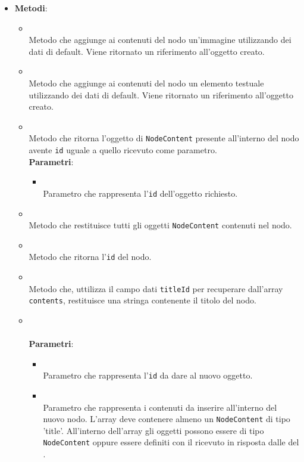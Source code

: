 \begin{itemize}
\begin{itemize}
\end{itemize}
\item \textbf{Metodi}:
\begin{itemize}
\item {}
\\ Metodo che aggiunge ai contenuti del nodo un'immagine utilizzando dei dati di default. Viene ritornato un riferimento all'oggetto creato.
\item {}
\\ Metodo che aggiunge ai contenuti del nodo un elemento testuale utilizzando dei dati di default. Viene ritornato un riferimento all'oggetto creato.
\item {}
\\ Metodo che ritorna l'oggetto di \texttt{NodeContent} presente all'interno del nodo avente \texttt{id} uguale a quello ricevuto come parametro.
\\ \textbf{Parametri}:
\begin{itemize}
\item {}
\\ Parametro che rappresenta l'\texttt{id} dell'oggetto richiesto.
\end{itemize}
\item {}
\\ Metodo che restituisce tutti gli oggetti \texttt{NodeContent} contenuti nel nodo.
\item {}
\\ Metodo che ritorna l'\texttt{id} del nodo.
\item {}
\\ Metodo che, uttilizza il campo dati \texttt{titleId} per recuperare dall'array \texttt{contents}, restituisce una stringa contenente il titolo del nodo.
\item {}
\\ \dpConstructor
\\ \textbf{Parametri}:
\begin{itemize}
\item {}
\\ Parametro che rappresenta l'\texttt{id} da dare al nuovo oggetto.
\item {}
\\ Parametro che rappresenta i contenuti da inserire all'interno del nuovo nodo. L'array deve contenere almeno un \texttt{NodeContent} di tipo 'title'. All'interno dell'array gli oggetti possono essere di tipo \texttt{NodeContent} oppure essere definiti con il \texttt{} ricevuto in risposta dalle  del .

\end{itemize}
\end{itemize}
\end{itemize}
